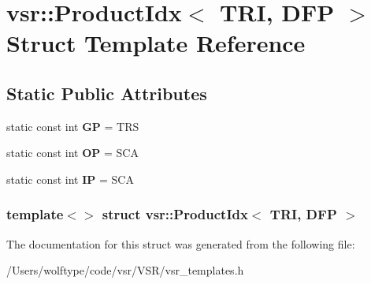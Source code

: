 \hypertarget{structvsr_1_1_product_idx_3_01_t_r_i_00_01_d_f_p_01_4}{\section{vsr\-:\-:Product\-Idx$<$ T\-R\-I, D\-F\-P $>$ Struct Template Reference}
\label{structvsr_1_1_product_idx_3_01_t_r_i_00_01_d_f_p_01_4}
}
\subsection*{Static Public Attributes}
\begin{DoxyCompactItemize}
\item 
\hypertarget{structvsr_1_1_product_idx_3_01_t_r_i_00_01_d_f_p_01_4_aaca1d2cfe621f8e2917634ca5fe78915}{static const int {\bfseries G\-P} = T\-R\-S}\label{structvsr_1_1_product_idx_3_01_t_r_i_00_01_d_f_p_01_4_aaca1d2cfe621f8e2917634ca5fe78915}

\item 
\hypertarget{structvsr_1_1_product_idx_3_01_t_r_i_00_01_d_f_p_01_4_ab0da3c55b535bca6164286bfc3c9e8ef}{static const int {\bfseries O\-P} = S\-C\-A}\label{structvsr_1_1_product_idx_3_01_t_r_i_00_01_d_f_p_01_4_ab0da3c55b535bca6164286bfc3c9e8ef}

\item 
\hypertarget{structvsr_1_1_product_idx_3_01_t_r_i_00_01_d_f_p_01_4_ae1ce0248cc5b965e5f502c70c3e815c9}{static const int {\bfseries I\-P} = S\-C\-A}\label{structvsr_1_1_product_idx_3_01_t_r_i_00_01_d_f_p_01_4_ae1ce0248cc5b965e5f502c70c3e815c9}

\end{DoxyCompactItemize}
\subsubsection*{template$<$$>$ struct vsr\-::\-Product\-Idx$<$ T\-R\-I, D\-F\-P $>$}



The documentation for this struct was generated from the following file\-:\begin{DoxyCompactItemize}
\item 
/\-Users/wolftype/code/vsr/\-V\-S\-R/vsr\-\_\-templates.\-h\end{DoxyCompactItemize}

